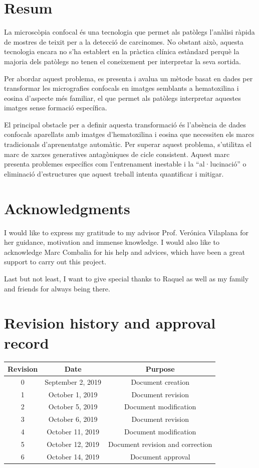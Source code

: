 \documentclass[a4paper,12pt,titlepage]{article}
\begin{document}
\thispagestyle{empty}

\section*{Resum}
La microscòpia confocal és una tecnologia que permet als patòlegs l'anàlisi ràpida de mostres de teixit per a la detecció de carcinomes. No obstant això, aquesta tecnologia encara no s'ha establert en la pràctica clínica estàndard perquè la majoria dels patòlegs no tenen el coneixement per interpretar la seva sortida.

Per abordar aquest problema, es presenta i avalua un mètode basat en dades per transformar les micrografies confocals en imatges semblants a hematoxilina i eosina d'aspecte més familiar, el que permet als patòlegs interpretar aquestes imatges sense formació específica.

El principal obstacle per a definir aquesta transformació és l'absència de dades confocals aparellats amb imatges d'hematoxilina i eosina que necessiten els marcs tradicionals d'aprenentatge automàtic. Per superar aquest problema, s'utilitza el marc de xarxes generatives antagòniques de cicle consistent.
Aquest marc presenta problemes específics com l'entrenament inestable i la ``al·lucinació'' o eliminació d'estructures que aquest treball intenta quantificar i mitigar.

\thispagestyle{empty}

\section*{Acknowledgments}
I would like to express my gratitude to my advisor Prof. Verónica
Vilaplana for her guidance, motivation and immense knowledge.
I would also like to acknowledge Marc Combalia for his help and advices,
which have been a great support to carry out this project.

Last but not least, I want to give special thanks to  Raquel as well as my family
and friends for always being there.

\thispagestyle{empty}

\section*{Revision history and approval record}
\begin{center}
\begin{tabular}{*3c}
\toprule
Revision & Date & Purpose \\
\midrule
0 & September 2, 2019 & Document creation \\
1 & October 1, 2019 & Document revision \\
2 & October 5, 2019 & Document modification \\
3 & October 6, 2019 & Document revision \\
4 & October 11, 2019 & Document modification \\
5 & October 12, 2019 & Document revision and correction\\
6 & October 14, 2019 & Document approval\\
\bottomrule
\end{tabular}
\end{center}
\end{document}
